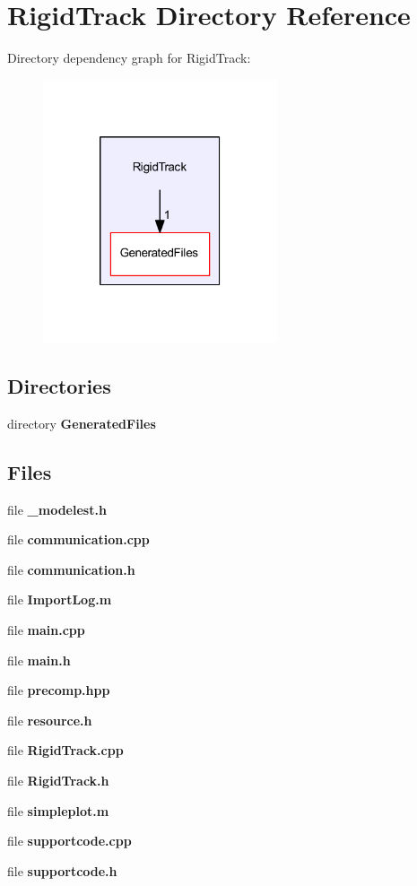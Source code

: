 \section{Rigid\+Track Directory Reference}
\label{dir_0a4a585469a8924d4665b56217bcc10e}
Directory dependency graph for Rigid\+Track\+:\nopagebreak
\begin{figure}[H]
\begin{center}
\leavevmode
\includegraphics[width=196pt]{dir_0a4a585469a8924d4665b56217bcc10e_dep}
\end{center}
\end{figure}
\subsection*{Directories}
\begin{DoxyCompactItemize}
\item 
directory \textbf{ Generated\+Files}
\end{DoxyCompactItemize}
\subsection*{Files}
\begin{DoxyCompactItemize}
\item 
file \textbf{ \+\_\+modelest.\+h}
\item 
file \textbf{ communication.\+cpp}
\item 
file \textbf{ communication.\+h}
\item 
file \textbf{ Import\+Log.\+m}
\item 
file \textbf{ main.\+cpp}
\item 
file \textbf{ main.\+h}
\item 
file \textbf{ precomp.\+hpp}
\item 
file \textbf{ resource.\+h}
\item 
file \textbf{ Rigid\+Track.\+cpp}
\item 
file \textbf{ Rigid\+Track.\+h}
\item 
file \textbf{ simpleplot.\+m}
\item 
file \textbf{ supportcode.\+cpp}
\item 
file \textbf{ supportcode.\+h}
\end{DoxyCompactItemize}
